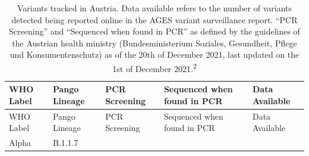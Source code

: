 \documentclass[
]{article}
\begin{document}
\begin{longtable}[]{@{}lllll@{}}
\caption{\label{tab:variantstracked} Variants tracked in Austria. Data available refers to the number of variants detected being reported online in the AGES variant surveillance report. ``PCR Screening'' and ``Sequenced when found in PCR'' as defined by the guidelines of the Austrian health ministry (Bundesministerium Soziales, Gesundheit, Pflege und Konsumentenschutz) as of the 20th of December 2021, last updated on the 1st of December 2021.\textsuperscript{2}}\tabularnewline
\toprule
\begin{minipage}[b]{0.11\columnwidth}\raggedright
WHO Label\strut
\end{minipage} & \begin{minipage}[b]{0.15\columnwidth}\raggedright
Pango Lineage\strut
\end{minipage} & \begin{minipage}[b]{0.15\columnwidth}\raggedright
PCR Screening\strut
\end{minipage} & \begin{minipage}[b]{0.29\columnwidth}\raggedright
Sequenced when found in PCR\strut
\end{minipage} & \begin{minipage}[b]{0.16\columnwidth}\raggedright
Data Available\strut
\end{minipage}\tabularnewline
\midrule
\endfirsthead
\toprule
\begin{minipage}[b]{0.11\columnwidth}\raggedright
WHO Label\strut
\end{minipage} & \begin{minipage}[b]{0.15\columnwidth}\raggedright
Pango Lineage\strut
\end{minipage} & \begin{minipage}[b]{0.15\columnwidth}\raggedright
PCR Screening\strut
\end{minipage} & \begin{minipage}[b]{0.29\columnwidth}\raggedright
Sequenced when found in PCR\strut
\end{minipage} & \begin{minipage}[b]{0.16\columnwidth}\raggedright
Data Available\strut
\end{minipage}\tabularnewline
\midrule
\endhead
\begin{minipage}[t]{0.11\columnwidth}\raggedright
Alpha\strut
\end{minipage} & \begin{minipage}[t]{0.15\columnwidth}\raggedright
B.1.1.7\strut
\end{minipage} & \begin{minipage}[t]{0.15\columnwidth}\raggedright

\end{minipage}
\end{longtable}
\end{document}
